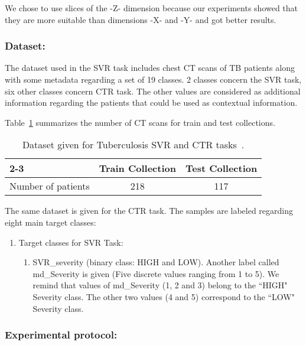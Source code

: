 We chose to use slices of the -Z- dimension because our experiments showed that they are more suitable than dimensions -X- and -Y- and got better results.

\subsubsection{Dataset:}
The dataset used in the SVR task includes chest CT scans of TB patients along with some metadata regarding a set of 19 classes. 2 classes concern the SVR task, six other classes concern CTR task. The other values are considered as additional information regarding the patients that could be used as contextual information.

Table~\ref{tab1} summarizes the number of CT scans for train and test collections.

\begin{table}
\center
\caption{Dataset given for Tuberculosis SVR and CTR tasks~\cite{ImageCLEF19}.}
\label{tab1}
\begin{tabular}{|l|c|c|}
\cline{2-3}
\multicolumn{1}{}{}  &     \multicolumn{1}{|c|}{Train Collection}  &    \multicolumn{1}{|c|}{Test Collection}  \\
\hline
Number of patients             &    218                     &        117\\
\hline
\end{tabular}
\end{table}

The same dataset is given for the CTR task. The samples are labeled regarding eight main target classes: 
\begin{enumerate}
\item Target classes for SVR Task:
\begin{enumerate}
\item SVR\_severity (binary class: HIGH and LOW). Another label called md\_Severity is given (Five discrete values ranging from 1 to 5). We remind that values of md\_Severity (1, 2 and 3) belong to the ``HIGH" Severity class. The other two values (4 and 5) correspond to the ``LOW" Severity class.
\end{enumerate}
\end{enumerate}
\subsubsection{Experimental protocol:}

